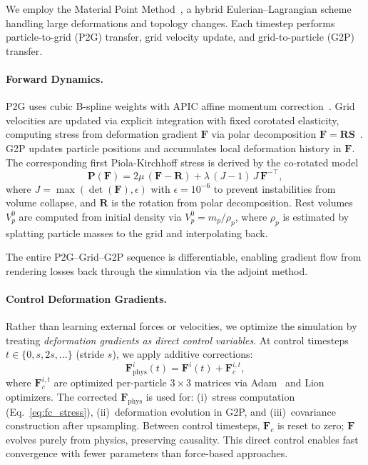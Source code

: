     We employ the Material Point Method~\cite{stomakhin2013material,jiang2016material}, a hybrid Eulerian--Lagrangian scheme handling large deformations and topology changes. Each timestep performs particle-to-grid (P2G) transfer, grid velocity update, and grid-to-particle (G2P) transfer.

\paragraph{Forward Dynamics.}
    P2G uses cubic B-spline weights with APIC affine momentum correction~\cite{jiang2016material}. Grid velocities are updated via explicit integration with fixed corotated elasticity, computing stress from deformation gradient $\mathbf{F}$ via polar decomposition $\mathbf{F}=\mathbf{R}\mathbf{S}$~\cite{stomakhin2013material}. G2P updates particle positions and accumulates local deformation history in $\mathbf{F}$. The corresponding first Piola-Kirchhoff stress is derived by the co-rotated model \cite{2012-FixedCoratedElasticty}
    \begin{equation}
    \label{eq:fc_stress}
    \mathbf{P}(\mathbf{F})=2\mu\,(\mathbf{F}-\mathbf{R})+\lambda\,(J-1)\,J\,\mathbf{F}^{-\top},
    \end{equation}
    where $J{=}\max(\det(\mathbf{F}), \epsilon)$ with $\epsilon{=}10^{-6}$ to prevent instabilities from volume collapse, and $\mathbf{R}$ is the rotation from polar decomposition. Rest volumes $V_p^0$ are computed from initial density via $V_p^0 = m_p/\rho_p$, where $\rho_p$ is estimated by splatting particle masses to the grid and interpolating back.
    
    The entire P2G--Grid--G2P sequence is differentiable, enabling gradient flow from rendering losses back through the simulation via the adjoint method.
        
\paragraph{Control Deformation Gradients.}
    Rather than learning external forces or velocities, we optimize the simulation by treating \emph{deformation gradients as direct control variables}. At control timesteps $t \in \{0, s, 2s, \ldots\}$ (stride $s$), we apply additive corrections:
    \begin{equation}
    \label{eq:control_F}
    \mathbf{F}_{\text{phys}}^i(t) = \mathbf{F}^i(t) + \mathbf{F}_c^{i,t},
    \end{equation}
    where $\mathbf{F}_c^{i,t}$ are optimized per-particle $3{\times}3$ matrices via Adam~\cite{kingma2017adammethodstochasticoptimization} and Lion~\cite{chen2023symbolicdiscoveryoptimizationalgorithms} optimizers. The corrected $\mathbf{F}_{\text{phys}}$ is used for:
    (i)~stress computation (Eq.~\ref{eq:fc_stress}), 
    (ii)~deformation evolution in G2P, and 
    (iii)~covariance construction after upsampling. 
    Between control timesteps, $\mathbf{F}_c$ is reset to zero; $\mathbf{F}$ evolves purely from physics, preserving causality. This direct control enables fast convergence with fewer parameters than force-based approaches.
    
